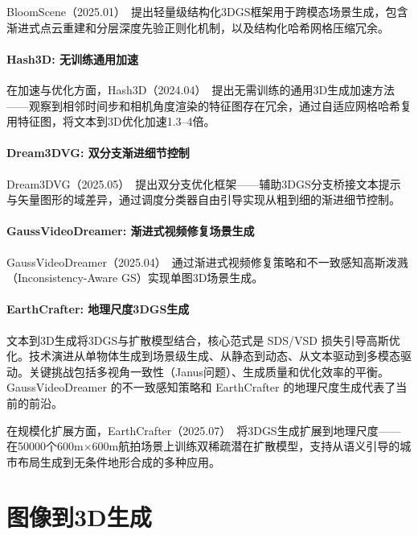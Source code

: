 BloomScene（2025.01）~\cite{2501_10462}提出轻量级结构化3DGS框架用于跨模态场景生成，包含渐进式点云重建和分层深度先验正则化机制，以及结构化哈希网格压缩冗余。

\paragraph{Hash3D: 无训练通用加速}

在加速与优化方面，Hash3D（2024.04）~\cite{2404_06091}提出无需训练的通用3D生成加速方法——观察到相邻时间步和相机角度渲染的特征图存在冗余，通过自适应网格哈希复用特征图，将文本到3D优化加速1.3--4倍。

\paragraph{Dream3DVG: 双分支渐进细节控制}

Dream3DVG（2025.05）~\cite{2505_21377}提出双分支优化框架——辅助3DGS分支桥接文本提示与矢量图形的域差异，通过调度分类器自由引导实现从粗到细的渐进细节控制。

\paragraph{GaussVideoDreamer: 渐进式视频修复场景生成}

GaussVideoDreamer（2025.04）~\cite{2504_10001}通过渐进式视频修复策略和不一致感知高斯泼溅（Inconsistency-Aware GS）实现单图3D场景生成。

\paragraph{EarthCrafter: 地理尺度3DGS生成}

\begin{takeaway}
文本到3D生成将3DGS与扩散模型结合，核心范式是 SDS/VSD 损失引导高斯优化。技术演进从单物体生成到场景级生成、从静态到动态、从文本驱动到多模态驱动。关键挑战包括多视角一致性（Janus问题）、生成质量和优化效率的平衡。GaussVideoDreamer 的不一致感知策略和 EarthCrafter 的地理尺度生成代表了当前的前沿。
\end{takeaway}

在规模化扩展方面，EarthCrafter（2025.07）~\cite{2507_16535}将3DGS生成扩展到地理尺度——在50000个600m$\times$600m航拍场景上训练双稀疏潜在扩散模型，支持从语义引导的城市布局生成到无条件地形合成的多种应用。



\section{图像到3D生成}
\label{sec:08_2}

